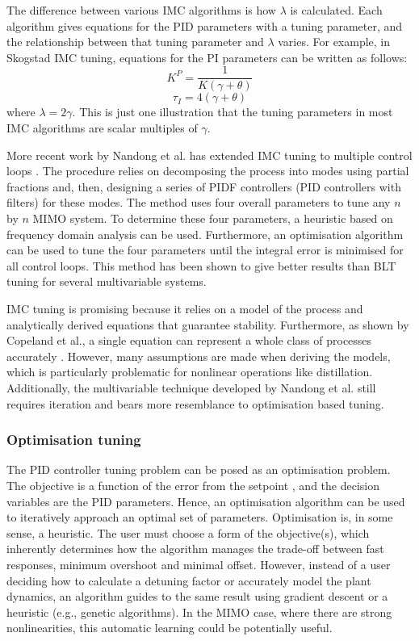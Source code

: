 The difference between various IMC algorithms is how $\lambda$ is calculated. Each algorithm gives equations for the PID parameters with a tuning parameter, and the relationship between that tuning parameter and $\lambda$ varies. For example, in Skogstad IMC tuning, equations for the PI parameters can be written as follows\cite{Copeland2010}: 
\begin{equation}
    K^P = \frac{1}{K(\gamma +\theta)}
\end{equation}
\begin{equation}
    \tau_I = 4(\gamma+\theta)
\end{equation}
where $\lambda=2\gamma$. This is just one illustration that the tuning parameters in most IMC algorithms are scalar multiples of $\gamma$.

More recent work by Nandong et al. has extended IMC tuning to multiple control loops \cite{Nandong2013, Nandong2015}. The procedure relies on decomposing the process into modes using partial fractions and, then, designing a series of PIDF controllers (PID controllers with filters) for these modes. The method uses four overall parameters to tune any $n$ by $n$ MIMO system. To determine these four parameters, a heuristic based on frequency domain analysis can be used. Furthermore, an optimisation algorithm can be used to tune the four parameters until the integral error is minimised for all control loops. This method has been shown to give better results than BLT tuning for several multivariable systems.  

IMC tuning is promising because it relies on a model of the process and analytically derived equations that guarantee stability. Furthermore, as shown by Copeland et al., a single equation can represent a whole class of processes accurately \cite{Copeland2010}. However, many assumptions are made when deriving the models, which is particularly problematic for nonlinear operations like distillation. Additionally, the multivariable technique developed by Nandong et al. \cite{Nandong2015, } still requires iteration and bears more resemblance to optimisation based tuning.

\subsubsection{Optimisation tuning}
The PID controller tuning problem can be posed as an optimisation problem.  The objective is a function of the error from the setpoint \cite{Pajares2019, Sumana2010, Rajapandiyan2012, Behroozsarand2012}, and the decision variables  are the PID parameters.  Hence, an optimisation algorithm can be used to iteratively approach an optimal set of parameters. Optimisation is, in some sense, a heuristic. The user must choose a form of the objective(s), which inherently determines how the algorithm manages the trade-off between fast responses, minimum overshoot and minimal offset. However, instead of a user deciding how to calculate a detuning factor or accurately model the plant dynamics, an algorithm guides to the same result using gradient descent or a heuristic (e.g., genetic algorithms). In the MIMO case, where there are strong nonlinearities, this automatic learning could be potentially useful. 

